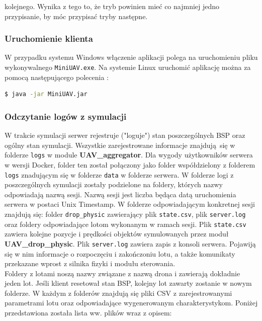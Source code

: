 \documentclass[15pt]{sprawozdanie}
\begin{document}
kolejnego. Wynika z tego to, że tryb powinien mieć co najmniej jedno przypisanie, by móc przypisać tryby następne.

\subsubsection{Uruchomienie klienta}

W przypadku systemu Windows włączenie aplikacji polega na uruchomieniu pliku wykonywalnego \texttt{MiniUAV.exe}. Na systemie Linux uruchomić aplikację można za pomocą następującego polecenia :

\begin{lstlisting}[language=bash]
	$ java -jar MiniUAV.jar
\end{lstlisting}

\subsubsection{Odczytanie logów z symulacji}

W trakcie symulacji serwer rejestruje ("loguje") stan poszczególnych BSP oraz ogólny stan symulacji. Wszystkie zarejestrowane informacje znajdują się w folderze \texttt{logs} w module \textbf{UAV\_aggregator}. Dla wygody użytkowników serwera w wersji Docker, folder ten został połączony jako folder współdzielony z folderem \texttt{logs} znadującym się w folderze \texttt{data} w folderze serwera. W folderze logi z poszczególnych symulacji zostały podzielone na foldery, których nazwy odpowiadają nazwą sesji. Nazwą sesji jest liczba będąca datą uruchomienia serwera w postaci Unix Timestamp. W folderze odpowiadającym konkretnej sesji znajdują się: folder \texttt{drop\_physic} zawierający plik \texttt{state.csv}, plik \texttt{server.log} oraz foldery odpowiadające lotom wykonanym w ramach sesji. Plik \texttt{state.csv} zawiera kolejne pozycje i prędkości objektów symulowanych przez moduł \textbf{UAV\_drop\_physic}. Plik \texttt{server.log} zawiera zapis z konsoli serwera. Pojawiją się w nim informacje o rozpoczęciu i zakończoniu lotu, a także komunikaty przekazane wprost z silnika fizyki i modułu sterowania.\\

Foldery z lotami noszą nazwy związane z nazwą drona i zawierają dokładnie jeden lot. Jeśli klient resetował stan BSP, kolejny lot zawarty zostanie w nowym folderze. W każdym z folderów znajdują się pliki CSV z zarejestrowanymi parametrami lotu oraz odpowiadające wygenerowanym charakterystykom. Poniżej przedstawiona została lista ww. plików wraz z opisem:
\end{document}
